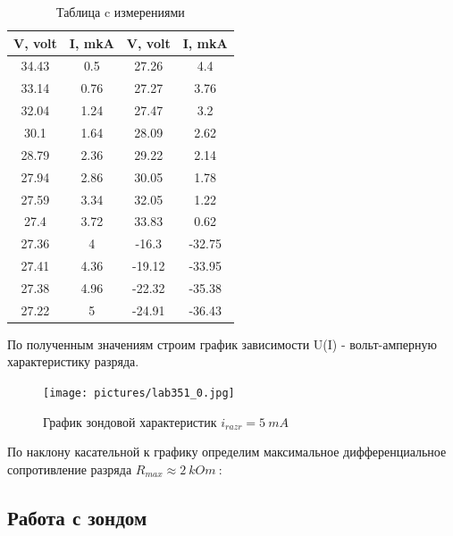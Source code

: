 \documentclass[a4paper, 14pt]{extarticle}%
\begin{document}
\begin{table}[!]
    \caption{Таблица c измерениями}
        \begin{center}
            \begin{tabular}{| c | c | c | c |}
            \hline
            \textbf{V, volt} & \textbf{I, mkA} & \textbf{V, volt} & \textbf{I, mkA}\\
            \hline
            34.43 & 0.5 & 27.26 & 4.4\\
            \hline
            33.14 & 0.76 & 27.27 & 3.76\\
            \hline
            32.04 & 1.24 & 27.47 & 3.2\\
            \hline
            30.1 & 1.64 & 28.09 & 2.62\\
            \hline
            28.79 & 2.36 & 29.22 & 2.14\\
            \hline
            27.94 & 2.86 & 30.05 & 1.78\\
            \hline
            27.59 & 3.34 & 32.05 & 1.22\\
            \hline
            27.4 & 3.72 & 33.83 & 0.62\\
            \hline
            27.36 & 4 & -16.3 & -32.75\\
            \hline
            27.41 & 4.36 & -19.12 & -33.95\\
            \hline
            27.38 & 4.96 & -22.32 & -35.38\\
            \hline
            27.22 & 5 & -24.91 & -36.43\\
            \hline
            \end{tabular}
        \end{center}
    \label{A_table}
\end{table}

По полученным значениям строим график зависимости U(I) - вольт-амперную характеристику разряда. 

\begin{figure}[h!]
	\centering
	\texttt{[image: pictures/lab351\_0.jpg]}
	\caption{График зондовой характеристик $i_{razr} = 5 \: mA$}
	\label{C}
\end{figure}

По наклону касательной к графику определим максимальное дифференциальное сопротивление разряда $R_{max} \approx 2 \: kOm \:$:

\subsection{Работа с зондом}
\end{document}
